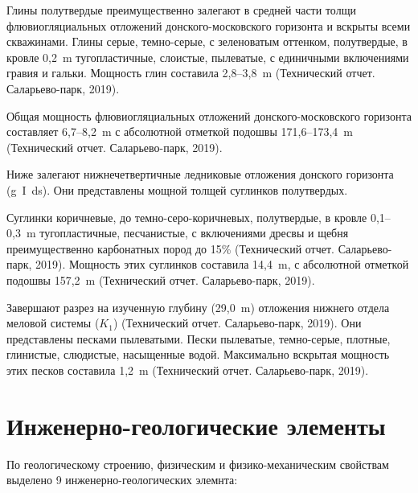 Глины полутвердые преимущественно залегают в средней части толщи флювиогляциальных 
отложений донского-московского горизонта и вскрыты всеми скважинами.
Глины серые, темно-серые, с зеленоватым оттенком, полутвердые, 
в кровле 0,2~\si{\meter} тугопластичные, слоистые, пылеватые, 
с единичными включениями гравия и гальки. 
Мощность глин составила 2,8--3,8~\si{\meter} (Технический отчет. Саларьево-парк, 2019).

Общая мощность флювиогляциальных отложений донского-московского горизонта 
составляет 6,7--8,2~\si{\meter} с абсолютной отметкой подошвы 
171,6--173,4~\si{\meter} (Технический отчет. Саларьево-парк, 2019).

Ниже залегают нижнечетвертичные ледниковые отложения донского горизонта (g~I~ds). 
Они представлены мощной толщей суглинков полутвердых.

Суглинки коричневые, до темно-серо-коричневых, полутвердые, 
в кровле 0,1--0,3~\si{\meter} тугопластичные, песчанистые, 
с включениями дресвы и щебня преимущественно карбонатных 
пород до 15\% (Технический отчет. Саларьево-парк, 2019). 
Мощность этих суглинков составила 14,4~\si{\meter}, 
с абсолютной отметкой подошвы 157,2~\si{\meter} (Технический отчет. Саларьево-парк, 2019).

Завершают разрез на изученную глубину (29,0~\si{\meter}) отложения 
нижнего отдела меловой системы ($K_1$) (Технический отчет. Саларьево-парк, 2019). 
Они представлены песками пылеватыми. Пески пылеватые, темно-серые, 
плотные, глинистые, слюдистые, насыщенные водой. 
Максимально вскрытая мощность этих песков 
составила 1,2~\si{\meter} (Технический отчет. Саларьево-парк, 2019).

\section{Инженерно-геологические элементы}\label{sec:ch2/sec2}

По геологическому строению, физическим и физико-механическим 
свойствам выделено 9 инженерно-геологических элемнта:

